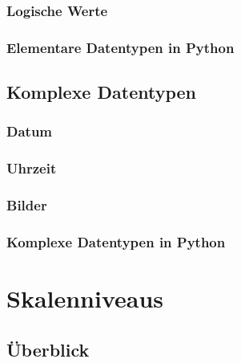 \documentclass[
  oneside]{book}
\theoremstyle{definition}
\theoremstyle{definition}
\theoremstyle{definition}
\theoremstyle{definition}
\theoremstyle{remark}
\begin{document}
\hypertarget{logische-werte}{%
\subsubsection{Logische Werte}\label{logische-werte}}

\hypertarget{elementare-datentypen-in-python}{%
\subsubsection{Elementare Datentypen in Python}\label{elementare-datentypen-in-python}}

\hypertarget{komplexe-datentypen}{%
\subsection{Komplexe Datentypen}\label{komplexe-datentypen}}

\hypertarget{datum}{%
\subsubsection{Datum}\label{datum}}

\hypertarget{uhrzeit}{%
\subsubsection{Uhrzeit}\label{uhrzeit}}

\hypertarget{bilder}{%
\subsubsection{Bilder}\label{bilder}}

\hypertarget{komplexe-datentypen-in-python}{%
\subsubsection{Komplexe Datentypen in Python}\label{komplexe-datentypen-in-python}}

\hypertarget{skalenniveaus}{%
\section{Skalenniveaus}\label{skalenniveaus}}

\hypertarget{uxfcberblick}{%
\subsection{Überblick}\label{uxfcberblick}}
\end{document}
